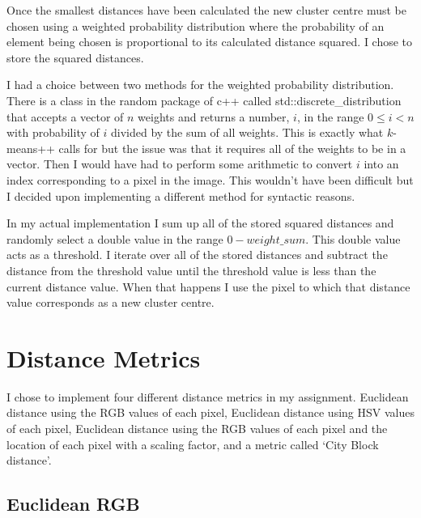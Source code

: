 \documentclass{article}
\begin{document}
Once the smallest distances have been calculated the new cluster centre must be chosen using a weighted probability distribution where the probability of an element being chosen is proportional to its calculated distance squared. I chose to store the squared distances.

I had a choice between two methods for the weighted probability distribution. There is a class in the random package of c++ called std::discrete\_distribution that accepts a vector of $n$ weights and returns a number, $i$, in the range $0 \leq i < n$ with probability of $i$ divided by the sum of all weights. This is exactly what $k$-means++ calls for but the issue was that it requires all of the weights to be in a vector. Then I would have had to perform some arithmetic to convert $i$ into an index corresponding to a pixel in the image. This wouldn't have been difficult but I decided upon implementing a different method for syntactic reasons. 

In my actual implementation I sum up all of the stored squared distances and randomly select a double value in the range $0-weight\_sum$. This double value acts as a threshold. I iterate over all of the stored distances and subtract the distance from the threshold value until the threshold value is less than the current distance value. When that happens I use the pixel to which that distance value corresponds as a new cluster centre. 

\section{Distance Metrics}

I chose to implement four different distance metrics in my assignment. Euclidean distance using the RGB values of each pixel, Euclidean distance using HSV values of each pixel, Euclidean distance using the RGB values of each pixel and the location of each pixel with a scaling factor, and a metric called `City Block distance'.

\subsection{Euclidean RGB}

 



\nocite{*}


\end{document}
